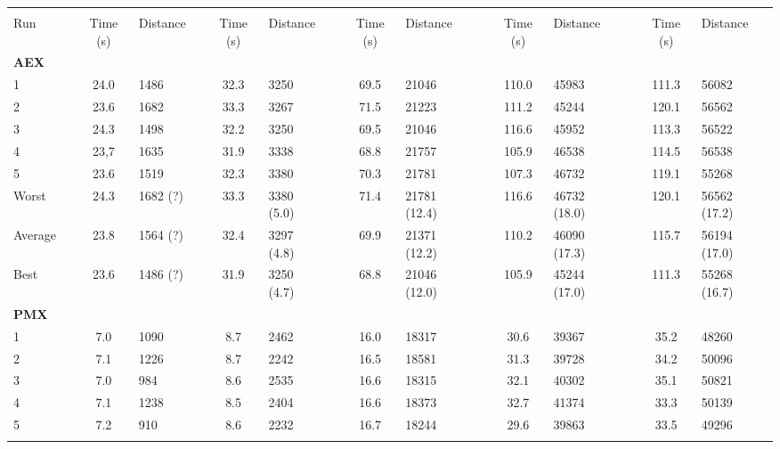 \begin{sidewaystable}[hbpt]\centering
\footnotesize{
\begin{tabular} {l l S  l l S l l S l l S l l S l}
\toprule
&&  &&  &&   & & &&  \\          
Run & & {Time (s)} & Distance & & {Time (s)} & Distance && {Time (s)} & Distance && {Time (s)} & Distance && {Time (s)} & Distance \\ \midrule\addlinespace
\textbf{AEX}\\
1   &&  24.0 & 1486 && 32.3 & 3250  && 69.5 & 21046  && 110.0 & 45983 && 111.3 & 56082 \\
2   &&  23.6 & 1682 && 33.3 & 3267  && 71.5 & 21223 && 111.2 & 45244 && 120.1 & 56562   \\
3   &&  24.3 & 1498 && 32.2 & 3250 &&  69.5 & 21046 && 116.6 & 45952 && 113.3 & 56522    \\
4   &&  23,7 & 1635&& 31.9 & 3338  && 68.8 & 21757 && 105.9 & 46538 && 114.5 & 56538 \\
5   &&  23.6 & 1519 &&  32.3 & 3380  && 70.3 & 21781 && 107.3 & 46732 && 119.1 & 55268  \\ \addlinespace
Worst  &&  24.3 & 1682 (?) && 33.3 & 3380 (5.0) && 71.4 & 21781 (12.4) && 116.6 & 46732 (18.0) && 120.1 & 56562 (17.2)  \\
Average&&  23.8 & 1564 (?) && 32.4 & 3297 (4.8) && 69.9 & 21371 (12.2) && 110.2 & 46090 (17.3) && 115.7 & 56194 (17.0)    \\
Best   && 23.6 & 1486 (?) && 31.9 & 3250 (4.7)  && 68.8 & 21046 (12.0) && 105.9 & 45244  (17.0)&& 111.3 & 55268 (16.7)     \\\midrule\addlinespace\addlinespace
\textbf{PMX}\\
1   &&  7.0 & 1090 && 8.7 & 2462  &&  16.0 & 18317  && 30.6 & 39367 && 35.2 & 48260 \\
2   &&  7.1 & 1226 && 8.7 & 2242  && 16.5 & 18581 && 31.3 & 39728 &&   34.2 & 50096    \\
3   &&  7.0 & 984 && 8.6 & 2535 &&  16.6 & 18315 &&  32.1    & 40302  && 35.1   & 50821      \\
4   &&  7.1 & 1238 && 8.5 & 2404  && 16.6     &  18373   && 32.7  & 41374 && 33.3  & 50139   \\
5   &&  7.2 & 910 && 8.6 & 2232  && 16.7 &  18244    && 29.6 & 39863  &&  33.5    & 49296    \\ \addlinespace

\end{tabular}}
\end{sidewaystable}
